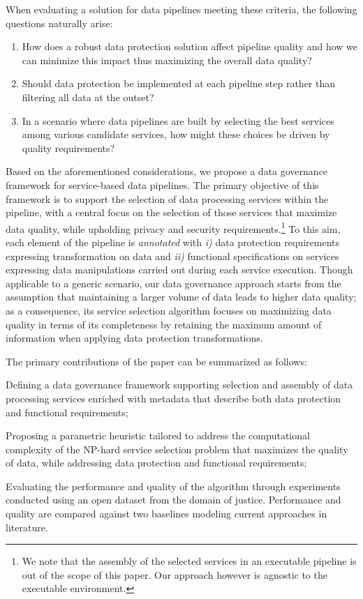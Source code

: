 When evaluating a solution {\color{OurColor}for data pipelines} meeting these criteria, the following questions naturally arise:
\begin{enumerate}
\item {\color{OurColor}How does a robust data protection solution affect pipeline quality and how we can minimize this impact thus maximizing the overall data quality?}
\item Should data protection be implemented at each pipeline step rather than filtering all data at the outset?
\item {\color{OurColor}In a scenario where data pipelines are built by selecting the best services among various candidate services, how might these choices be driven by quality requirements?}
\end{enumerate}

Based on the aforementioned considerations, we propose a data governance framework for {\color{OurColor}service-based data pipelines}. %
The primary objective of this framework is to support the selection of data processing services within the pipeline, with a central focus on the selection of those services that {\color{OurColor}maximize} data quality, while upholding privacy and security requirements.\footnote{{\color{OurColor}We note that the assembly of the selected services in an executable pipeline is out of the scope of this paper. Our approach however is agnostic to the executable environment.}}
To this aim, each element of the pipeline is \textit{annotated} with \emph{i)} data protection requirements expressing transformation on data and \emph{ii)} functional specifications on services expressing data manipulations carried out during each service execution.
Though applicable to a generic scenario, our data governance approach starts from the assumption that maintaining a larger volume of data leads to higher data quality; as a consequence, its service selection algorithm focuses on maximizing data quality {\color{OurColor}in terms of its completeness} by retaining the maximum amount of information when applying data protection transformations.

The primary contributions of the paper can be summarized as follows:
\begin{enumerate*}
  \item Defining a data governance framework supporting selection and assembly of data processing services enriched with metadata that describe both data protection and functional requirements;
  \item Proposing a parametric heuristic tailored to address the computational complexity of the NP-hard service selection problem {\color{OurColor}that maximizes the quality of data, while addressing data protection and functional requirements};
  \item Evaluating the performance and quality of the algorithm through experiments conducted using {\color{OurColor}an open dataset from the domain of justice. Performance and quality are compared against two baselines modeling current approaches in literature.}
\end{enumerate*}

